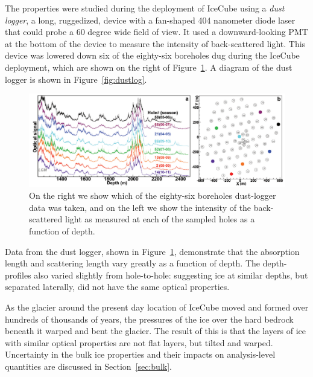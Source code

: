 \documentclass[main.tex]{subfiles}
\begin{document}
The properties were studied during the deployment of IceCube using a \textit{dust logger}, a long, ruggedized, device with a fan-shaped 404 nanometer diode laser that could probe a 60 degree wide field of view. 
It used a downward-looking PMT at the bottom of the device to measure the intensity of back-scattered light.
This device was lowered down six of the eighty-six boreholes dug during the IceCube deployment, which are shown on the right of Figure~\ref{fig:icetilt}.
A diagram of the dust logger is shown in Figure~\ref{fig:dustlog}.

\begin{figure}  
    \centering
    \includegraphics[width=0.8\linewidth]{figures/tilt.png}
    \caption{On the right we show which of the eighty-six boreholes dust-logger data was taken, and on the left we show the intensity of the back-scattered light as measured at each of the sampled holes as a function of depth.}\label{fig:icetilt}
\end{figure}

Data from the dust logger, shown in Figure~\ref{fig:icetilt}, demonstrate that the absorption length and scattering length vary greatly as a function of depth. 
The depth-profiles also varied slightly from hole-to-hole: suggesting ice at similar depths, but separated laterally, did not have the same optical properties.

As the glacier around the present day location of IceCube moved and formed over hundreds of thousands of years, the pressures of the ice over the hard bedrock beneath it warped and bent the glacier. 
The result of this is that the layers of ice with similar optical properties are not flat layers, but tilted and warped. 
Uncertainty in the bulk ice properties and their impacts on analysis-level quantities are discussed in Section~\ref{sec:bulk}.
\end{document}
